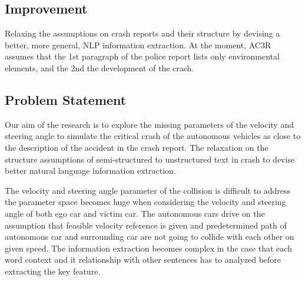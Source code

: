 \subsection{Improvement}
Relaxing the assumptions on crash reports and their structure by devising a better, more general, NLP information extraction. At the moment, AC3R assumes that the 1st paragraph of the police report lists only environmental elements, and the 2nd the development of the crash.

\subsection{Problem Statement}

Our aim of the research is to explore the missing parameters of the velocity and steering angle to simulate the critical crash of the autonomous vehicles as close to the description of the accident in the crash report. The relaxation on the structure assumptions of semi-structured to unstructured text in crash to devise better natural language information extraction. 


The velocity and steering angle parameter of the collision is difficult to address the parameter space becomes huge when considering the velocity and steering angle of both ego car and victim car. The autonomous cars drive on the assumption that feasible velocity reference is given and predetermined path of autonomous car and surrounding car are not going to collide with each other on given speed. The information extraction becomes complex in the case that each word context and it relationship with other sentences has to analyzed before extracting the key feature. 




